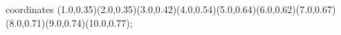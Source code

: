 					coordinates { (1.0,0.35)(2.0,0.35)(3.0,0.42)(4.0,0.54)(5.0,0.64)(6.0,0.62)(7.0,0.67)(8.0,0.71)(9.0,0.74)(10.0,0.77)};